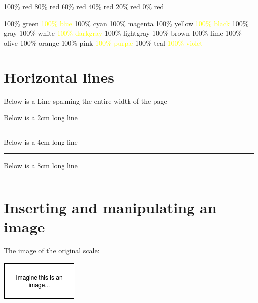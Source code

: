\documentclass[12pt, letterpaper, oneside]{article}
\begin{document}
\colorbox{red!100}{100\% red}
\colorbox{red!80}{80\% red}
\colorbox{red!60}{60\% red}
\colorbox{red!40}{40\% red}
\colorbox{red!20}{20\% red}
\colorbox{red!0}{0\% red}

\colorbox{green!100}{100\% green}
\colorbox{blue!100}{\textcolor{yellow}{100\% blue}}
\colorbox{cyan!100}{100\% cyan}
\colorbox{magenta!100}{100\% magenta}
\colorbox{yellow!100}{100\% yellow}
\colorbox{black!100}{\textcolor{yellow}{100\% black}}
\colorbox{gray!100}{100\% gray}
\colorbox{white!100}{100\% white}
\colorbox{darkgray!100}{\textcolor{yellow}{100\% darkgray}}
\colorbox{lightgray!100}{100\% lightgray}
\colorbox{brown!100}{100\% brown}
\colorbox{lime!100}{100\% lime}
\colorbox{olive!100}{100\% olive}
\colorbox{orange!100}{100\% orange}
\colorbox{pink!100}{100\% pink}
\colorbox{purple!100}{\textcolor{yellow}{100\% purple}}
\colorbox{teal!100}{100\% teal}
\colorbox{violet!100}{\textcolor{yellow}{100\% violet}}

\section{Horizontal lines}

Below is a Line spanning the entire width of the page

\noindent\makebox[\linewidth]{\rule{\paperwidth}{0.4pt}}

Below is a 2cm long line

\noindent\rule{2cm}{0.4pt}

Below is a 4cm long line

\noindent\rule{4cm}{0.4pt}

Below is a 8cm long line

\noindent\rule{8cm}{0.4pt}

\section{Inserting and manipulating an image}

The image of the original scale:

\includegraphics{image-1.png}
\end{document}
